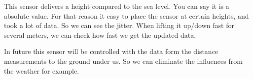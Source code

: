 This sensor delivers a height compared to the sea level. You can say it is a absolute value.
For that reason it easy to place the sensor at certain heights, and took a lot of data. So we can see the jitter. When lifting it up/down fast for several meters, we can check how fast we get the updated data.

In future this sensor will be controlled with the data form the distance measurements to the ground under us. So we can eliminate the influences from the weather for example.



%
%
%
%
%
%
%
